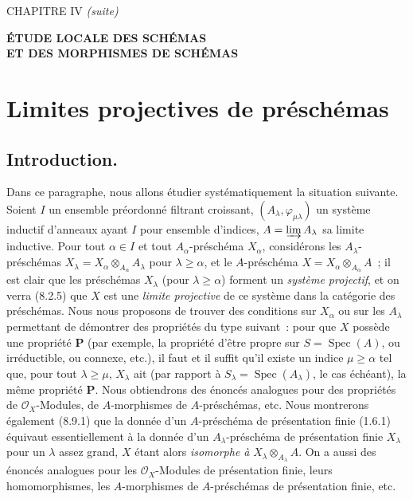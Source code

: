 \clearpage
\thispagestyle{plain}
\label{chapter:IV3-fr}

\begin{center}
{\large CHAPITRE IV \textit{(suite)}\par}
\vspace{1.5em}
{\Large\bfseries ÉTUDE LOCALE DES SCHÉMAS\\
ET DES MORPHISMES DE SCHÉMAS\par}
\end{center}

\setcounter{section}{7}
\section{Limites projectives de préschémas}
\label{section:IV.8-fr}

\setcounter{subsection}{0}
\subsection{Introduction.}
\label{subsection:IV.8.1-fr}

\begin{env}[8.1.1]
\label{IV.8.1.1-fr}
Dans ce paragraphe, nous allons étudier systématiquement la situation
suivante. Soient $I$ un ensemble préordonné filtrant croissant,
$(A_\lambda,\varphi_{\mu\lambda})$ un système inductif d'anneaux ayant $I$
pour ensemble d'indices, $A=\varinjlim A_\lambda$ sa limite inductive. Pour
tout $\alpha\in I$ et tout $A_\alpha$-préschéma $X_\alpha$, considérons les
$A_\lambda$-préschémas
$X_\lambda=X_\alpha\otimes_{A_\alpha}A_\lambda$ pour $\lambda\geq\alpha$,
et le $A$-préschéma $X=X_\alpha\otimes_{A_\alpha}A$~; il est clair que les
préschémas $X_\lambda$ (pour $\lambda\geq\alpha$) forment un \emph{système
projectif}, et on verra (8.2.5) que $X$ est une \emph{limite projective} de ce
système dans la catégorie des préschémas. Nous nous proposons de trouver des
conditions sur $X_\alpha$ ou sur les $A_\lambda$ permettant de démontrer des
propriétés du type suivant~: pour que $X$ possède une propriété $\boldsymbol{P}$ (par
exemple, la propriété d'être propre sur $S=\operatorname{Spec}(A)$, ou
irréductible, ou connexe, etc.), il faut et il suffit qu'il existe un indice
$\mu\geq\alpha$ tel que, pour tout $\lambda\geq\mu$, $X_\lambda$ ait (par
rapport à $S_\lambda=\operatorname{Spec}(A_\lambda)$, le cas échéant), la
même propriété $\boldsymbol{P}$. Nous obtiendrons des énoncés analogues pour des propriétés
de $\mathcal O_X$-Modules, de $A$-morphismes de $A$-préschémas, etc. Nous
montrerons également (8.9.1) que la donnée d'un $A$-préschéma de présentation
finie (1.6.1) équivaut essentiellement à la donnée d'un $A_\lambda$-préschéma
de présentation finie $X_\lambda$ pour un $\lambda$ assez grand, $X$ étant
alors \emph{isomorphe à} $X_\lambda\otimes_{A_\lambda}A$. On a aussi des
énoncés analogues pour les $\mathcal O_X$-Modules de présentation finie,
leurs homomorphismes, les $A$-morphismes de $A$-préschémas de présentation
finie, etc.
\end{env}


